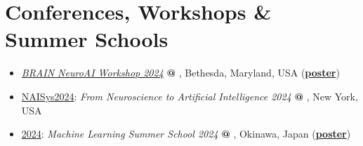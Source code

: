 \documentclass[letterpaper,11pt]{article}
\begin{document}
\section{Conferences, Workshops \& Summer Schools}
  \begin{itemize}
    \item \label{BrainNeuroAIWorkshop2024PosterMarker} \href{https://n4solutionsllc.com/brainneuroai/}{{
    } \textit{BRAIN NeuroAI Workshop 2024}} \textbf{@} \href{https://www.nih.gov/}{}, Bethesda, Maryland, USA (\href{https://raw.githubusercontent.com/ckaraneen/brain-neuroai-workshop-2024/main/poster.pdf}{\textbf{poster}})
    \item \href{https://meetings.cshl.edu/meetings.aspx?meet=NAISYS&year=24}{{{}}NAISys2024}: \textit{From Neuroscience to Artificial Intelligence 2024} \textbf{@} \href{https://www.cshl.edu/}{}, New York, USA
    \item \label{MLSS2024PosterMarker} \href{https://groups.oist.jp/mlss}{{{}}2024}: \textit{Machine Learning Summer School 2024} \textbf{@} \href{https://www.oist.jp/}{}, Okinawa, Japan (\href{https://raw.githubusercontent.com/ckaraneen/mlss2024/main/poster.pdf}{\textbf{poster}})
  \end{itemize}

\end{document}
